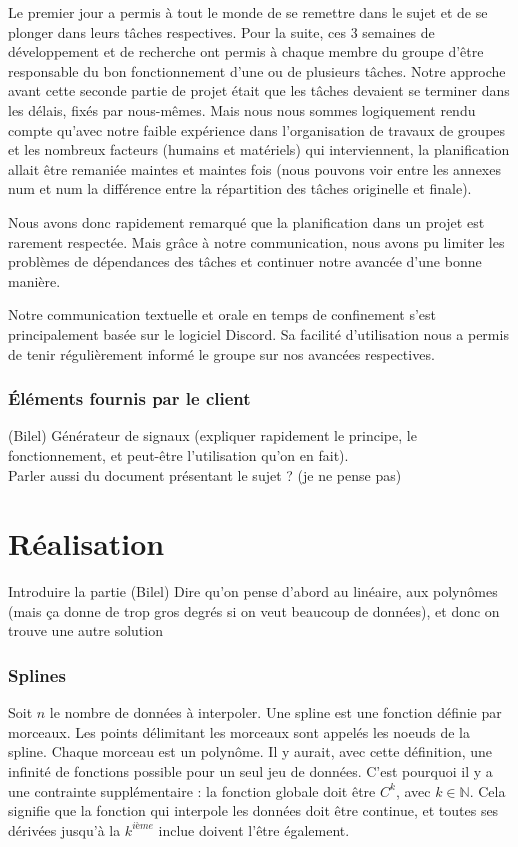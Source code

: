 \documentclass[a4paper,12pt]{article} %
\begin{document}
        Le premier jour a permis à tout le monde de se remettre dans le sujet et de se plonger dans leurs tâches respectives. Pour la suite, ces 3 semaines de développement et de recherche ont permis à chaque membre du groupe d'être responsable du bon fonctionnement d'une ou de plusieurs tâches. Notre approche avant cette seconde partie de projet était que les tâches devaient se terminer dans les délais, fixés par nous-mêmes.
        Mais nous nous sommes logiquement rendu compte qu'avec notre faible expérience dans l'organisation de travaux de groupes et les nombreux facteurs (humains et matériels) qui interviennent, la planification allait être remaniée maintes et maintes fois (nous pouvons voir entre les annexes num et num la différence entre la répartition des tâches originelle et finale).
        
        Nous avons donc rapidement remarqué que la planification dans un projet est rarement respectée. Mais grâce à notre communication, nous avons pu limiter les problèmes de dépendances des tâches et continuer notre avancée d'une bonne manière.
        
        Notre communication textuelle et orale en temps de confinement s'est principalement basée sur le logiciel Discord. Sa facilité d'utilisation nous a permis de tenir régulièrement informé le groupe sur nos avancées respectives.
        
	\section{Éléments fournis par le client}
	    (Bilel)
		Générateur de signaux (expliquer rapidement le principe, le fonctionnement, et peut-être l'utilisation qu'on en fait).
		\\Parler aussi du document présentant le sujet ? (je ne pense pas)



\renewcommand\partname{}
\part{Réalisation}
	Introduire la partie (Bilel)
	Dire qu'on pense d'abord au linéaire, aux polynômes (mais ça donne de trop gros degrés si on veut beaucoup de données), et donc on trouve une autre solution
	\section{Splines}
	    Soit $n$ le nombre de données à interpoler.
	    Une spline est une fonction définie par morceaux. Les points délimitant les morceaux sont appelés les noeuds de la spline. Chaque morceau est un polynôme. Il y aurait, avec cette définition, une infinité de fonctions possible pour un seul jeu de données. C'est pourquoi il y a une contrainte supplémentaire : la fonction globale doit être $C^k$, avec $k\in\mathbb{N}$. Cela signifie que la fonction qui interpole les données doit être continue, et toutes ses dérivées jusqu'à la $k^{ième}$ inclue doivent l'être également.\\
	    
\end{document}
